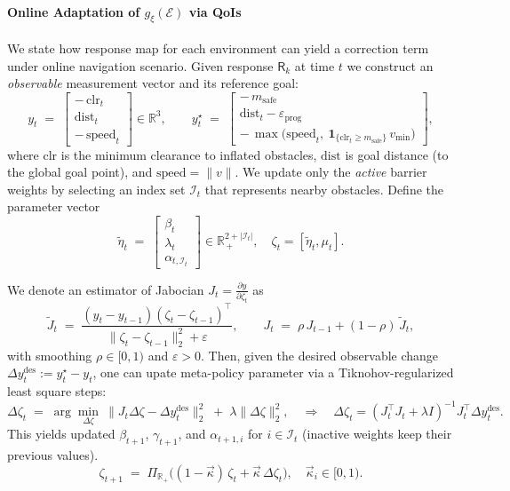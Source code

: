 \paragraph{Online Adaptation of $g_{\xi}(\mathcal{E})$ via QoIs}
We state how response map for each environment can yield a correction term under online navigation scenario. Given response $\mathsf{R}_k$ at time $t$ we construct an \emph{observable} measurement vector and its reference goal:
\[
y_t \;=\; \begin{bmatrix}
-\,\mathrm{clr}_t \\[2pt]
\mathrm{dist}_t \\[2pt]
-\,\mathrm{speed}_t
\end{bmatrix}\in\mathbb R^3,
\qquad
y_t^\star \;=\; \begin{bmatrix}
-\,m_{\mathrm{safe}}\\[2pt]
\mathrm{dist}_t-\varepsilon_{\mathrm{prog}}\\[2pt]
-\,\max\big(\mathrm{speed}_t,\ \mathbf 1_{\{\mathrm{clr}_t\ge m_{\mathrm{safe}}\}}\,v_{\min}\big)
\end{bmatrix},
\]
where $\mathrm{clr}$ is the minimum clearance to inflated obstacles, $\mathrm{dist}$ is goal distance (to the global goal point), and $\mathrm{speed}=\|v\|$.  
We update only the \emph{active} barrier weights by selecting an index set $\mathcal I_t$ that represents nearby obstacles. Define the parameter vector
\[
\tilde{\eta}_t\;=\;\begin{bmatrix}\beta_t\\ \lambda_t\\\alpha_{t,\mathcal I_t} \end{bmatrix}\in\mathbb R^{2+|\mathcal I_t|}_{\,+}, \quad \zeta_t=[\tilde{\eta}_t,\mu_t].
\]

We denote an estimator of Jabocian $J_t=\frac{\partial y}{\partial \zeta_t}$ as  
\[
\widetilde J_t\;=\;\frac{(y_t-y_{t-1})(\zeta_t-\zeta_{t-1})^\top}{\|\zeta_t-\zeta_{t-1}\|_2^2+\varepsilon},
\qquad
J_t\;=\;\rho\,J_{t-1}+(1-\rho)\,\widetilde J_t,
\]
with smoothing $\rho\in[0,1)$ and $\varepsilon>0$. Then, given the desired observable change $\Delta y^{\mathrm{des}}_t:=y_t^\star-y_t$, one can upate meta-policy parameter via a Tiknohov-regularized least square steps:
\[
\Delta\zeta_t \;=\; \arg\min_{\Delta\zeta}\ \big\|J_t\Delta\zeta-\Delta y^{\mathrm{des}}_t\big\|_2^2
\;+\;\lambda\|\Delta\zeta\|_2^2,
\quad\Rightarrow\quad
\Delta\zeta_t=(J_t^\top J_t+\lambda I)^{-1}J_t^\top\Delta y^{\mathrm{des}}_t.
\]
This yields updated $\beta_{t+1}$, $\gamma_{t+1}$, and $\alpha_{t+1,i}$ for $i\in\mathcal I_t$ (inactive weights keep their previous values).
\[
\zeta_{t+1}\;=\;\Pi_{\mathbb R_+}\big((1-\vec{\kappa})\,\zeta_t+ \vec{\kappa}\,\Delta\zeta_{t}\big),\quad \vec{\kappa}_i\in[0,1).
\]

